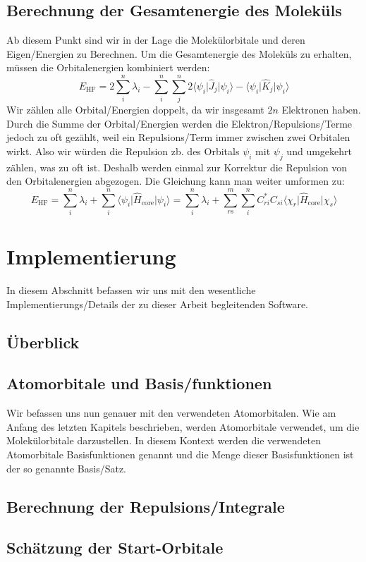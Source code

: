 \subsection{Berechnung der Gesamtenergie des Moleküls}
Ab diesem Punkt sind wir in der Lage die Molekülorbitale und
deren Eigen\-/Energien zu Berechnen. Um die Gesamtenergie des Moleküls zu erhalten,
müssen die Orbitalenergien kombiniert werden:
\begin{equation}
    E_{\text{HF}} = 2 \sum_i^n \lambda_i - \sum_i^n \sum_j^n
    2 \langle \psi_i \vert \hat{J}_j \vert \psi_i \rangle
    - \langle \psi_i \vert \hat{K}_j \vert \psi_i \rangle
\end{equation}
Wir zählen alle Orbital\-/Energien doppelt, da wir insgesamt $2n$ Elektronen haben.
Durch die Summe der Orbital\-/Energien werden die Elektron\-/Repulsions\-/Terme
jedoch zu oft gezählt, weil ein Repulsions\-/Term immer zwischen zwei Orbitalen wirkt.
Also wir würden die Repulsion zb. des Orbitals $\psi_i$ mit $\psi_j$ und umgekehrt zählen,
was zu oft ist.
Deshalb werden einmal zur Korrektur die Repulsion von den Orbitalenergien abgezogen.
Die Gleichung kann man weiter umformen zu:
\begin{equation}
    E_{\text{HF}} = \sum_i^n \lambda_i
    + \sum_i^n \langle \psi_i \vert \hat{H}_{\text{core}} \vert \psi_i \rangle
    = \sum_i^n \lambda_i
    + \sum_{rs}^m \sum_i^{n} C_{ri}^*C_{si}
    \langle \chi_r \vert \hat{H}_{\text{core}} \vert \chi_s \rangle
\end{equation}

\cite[S. 229-230]{lewars_2016}

\section{Implementierung}
In diesem Abschnitt befassen wir uns mit den wesentliche Implementierungs\-/Details
der zu dieser Arbeit begleitenden Software.

\subsection{Überblick}

\subsection{Atomorbitale und Basis\-/funktionen}\label{basis-functions-section}
Wir befassen uns nun genauer mit den verwendeten Atomorbitalen.
Wie am Anfang des letzten Kapitels beschrieben, werden Atomorbitale verwendet,
um die Molekülorbitale darzustellen. In diesem Kontext werden die verwendeten Atomorbitale
Basisfunktionen genannt und die Menge dieser Basisfunktionen
ist der so genannte Basis\-/Satz.

\subsection{Berechnung der Repulsions\-/Integrale}\label{repulsion-integrals-section}

\subsection{Schätzung der Start-Orbitale}
